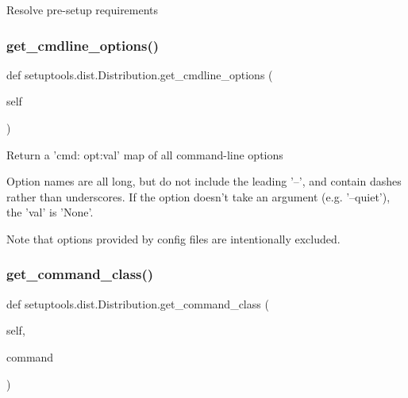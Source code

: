 \begin{DoxyVerb}Resolve pre-setup requirements\end{DoxyVerb}
 \mbox{\label{classsetuptools_1_1dist_1_1_distribution_ac8c369e93a63e253f99d4d2ae842b250}} 
\subsubsection{\texorpdfstring{get\+\_\+cmdline\+\_\+options()}{get\_cmdline\_options()}}
{\footnotesize\ttfamily def setuptools.\+dist.\+Distribution.\+get\+\_\+cmdline\+\_\+options (\begin{DoxyParamCaption}\item[{}]{self }\end{DoxyParamCaption})}

\begin{DoxyVerb}Return a '{cmd: {opt:val}}' map of all command-line options

Option names are all long, but do not include the leading '--', and
contain dashes rather than underscores.  If the option doesn't take
an argument (e.g. '--quiet'), the 'val' is 'None'.

Note that options provided by config files are intentionally excluded.
\end{DoxyVerb}
 \mbox{\label{classsetuptools_1_1dist_1_1_distribution_a76159456291f4bb9ed2ccb935d480240}} 
\subsubsection{\texorpdfstring{get\+\_\+command\+\_\+class()}{get\_command\_class()}}
{\footnotesize\ttfamily def setuptools.\+dist.\+Distribution.\+get\+\_\+command\+\_\+class (\begin{DoxyParamCaption}\item[{}]{self,  }\item[{}]{command }\end{DoxyParamCaption})}

